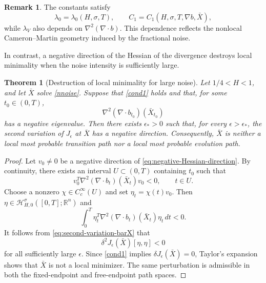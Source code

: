 \documentclass[preprint,12pt]{elsarticle}
\newtheorem{theorem}{Theorem}[section]
\theoremstyle{definition}
\newtheorem{remark}{Remark}[section]
\theoremstyle{plain}
\begin{document}
\begin{remark}
\label{rem:constants-H-sigma}
The constants satisfy
\begin{equation*}
    \lambda_0=\lambda_0(H,\sigma,T),
    \qquad
    C_1=C_1(H,\sigma,T,\nabla b,\bar X),
\end{equation*}
while $\lambda_V$ also depends on
$\nabla^2(\nabla\!\cdot b)$. This dependence reflects the nonlocal
Cameron--Martin geometry induced by the fractional noise.
\end{remark}

In contrast, a negative direction of the Hessian of the divergence
destroys local minimality when the noise intensity is sufficiently
large.

\begin{theorem}[Destruction of local minimality for large noise]
\label{thm:destruction-large-noise}
Let $1/4<H<1$, and let $\bar X$ solve \eqref{nnoise}. Suppose that
\eqref{cond1} holds and that, for some $t_0\in(0,T)$,
\begin{equation}
\label{eq:negative-Hessian-direction}
    \nabla^2(\nabla\!\cdot b_{t_0})(\bar X_{t_0})
\end{equation}
has a negative eigenvalue. Then there exists $\epsilon_*>0$ such that,
for every $\epsilon>\epsilon_*$, the second variation of $J_\epsilon$
at $\bar X$ has a negative direction. Consequently, $\bar X$ is
neither a local most probable transition path nor a local most
probable evolution path.
\end{theorem}

\begin{proof}
Let $v_0\neq0$ be a negative direction of
\eqref{eq:negative-Hessian-direction}. By continuity, there exists an
interval $U\subset(0,T)$ containing $t_0$ such that
\begin{equation*}
    v_0^T
    \nabla^2(\nabla\!\cdot b_t)(\bar X_t)
    v_0<0,
    \qquad t\in U.
\end{equation*}
Choose a nonzero $\chi\in C_c^\infty(U)$ and set
$\eta_t=\chi(t)v_0$. Then
$\eta\in\mathcal H_{H,0}^\sigma([0,T];\mathbb R^n)$ and
\begin{equation*}
    \int_0^T
    \eta_t^T
    \nabla^2(\nabla\!\cdot b_t)(\bar X_t)
    \eta_t\,dt
    <0.
\end{equation*}
It follows from \eqref{eq:second-variation-barX} that
\begin{equation*}
    \delta^2J_\epsilon(\bar X)[\eta,\eta]<0
\end{equation*}
for all sufficiently large $\epsilon$. Since \eqref{cond1} implies
$\delta J_\epsilon(\bar X)=0$, Taylor's expansion shows that $\bar X$
is not a local minimizer. The same perturbation is admissible in both
the fixed-endpoint and free-endpoint path spaces.
\end{proof}
\end{document}
